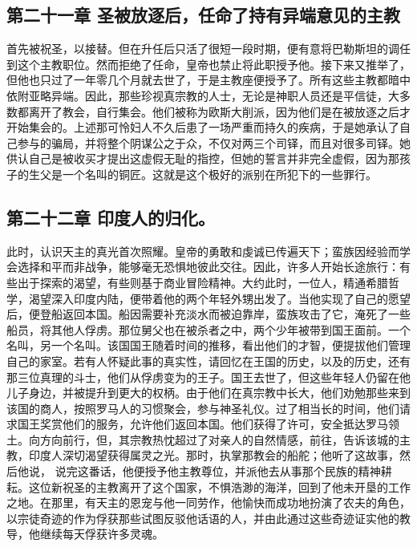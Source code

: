
\subsection{第二十一章 圣被放逐后，任命了持有异端意见的主教}

首先被祝圣，以接替。但在升任后只活了很短一段时期，便有意将巴勒斯坦的调任到这个主教职位。然而拒绝了任命，皇帝也禁止将此职授予他。接下来又推举了，但他也只过了一年零几个月就去世了，于是主教座便授予了。所有这些主教都暗中依附亚略异端。因此，那些珍视真宗教的人士，无论是神职人员还是平信徒，大多数都离开了教会，自行集会。他们被称为欧斯大削派，因为他们是在被放逐之后才开始集会的。上述那可怜妇人不久后患了一场严重而持久的疾病，于是她承认了自己参与的骗局，并将整个阴谋公之于众，不仅对两三个司铎，而且对很多司铎。她供认自己是被收买才提出这虚假无耻的指控，但她的誓言并非完全虚假，因为那孩子的生父是一个名叫的铜匠。这就是这个极好的派别在所犯下的一些罪行。\par


\subsection{第二十二章 印度人的归化。}

此时，认识天主的真光首次照耀。皇帝的勇敢和虔诚已传遍天下；蛮族因经验而学会选择和平而非战争，能够毫无恐惧地彼此交往。因此，许多人开始长途旅行：有些出于探索的渴望，有些则基于商业冒险精神。大约此时，一位人，精通希腊哲学，渴望深入印度内陆，便带着他的两个年轻外甥出发了。当他实现了自己的愿望后，便登船返回本国。船因需要补充淡水而被迫靠岸，蛮族攻击了它，淹死了一些船员，将其他人俘虏。那位舅父也在被杀者之中，两个少年被带到国王面前。一个名叫，另一个名叫。该国国王随着时间的推移，看出他们的才智，便提拔他们管理自己的家室。若有人怀疑此事的真实性，请回忆在王国的历史，以及的历史，还有那三位真理的斗士，他们从俘虏变为的王子。国王去世了，但这些年轻人仍留在他儿子身边，并被提升到更大的权柄。由于他们在真宗教中长大，他们劝勉那些来到该国的商人，按照罗马人的习惯聚会，参与神圣礼仪。过了相当长的时间，他们请求国王奖赏他们的服务，允许他们返回本国。他们获得了许可，安全抵达罗马领土。向方向前行，但，其宗教热忱超过了对亲人的自然情感，前往，告诉该城的主教，印度人深切渴望获得属灵之光。那时，执掌那教会的船舵；他听了这故事，然后他说， 说完这番话，他便授予他主教尊位，并派他去从事那个民族的精神耕耘。这位新祝圣的主教离开了这个国家，不惧浩渺的海洋，回到了他未开垦的工作之地。在那里，有天主的恩宠与他一同劳作，他愉快而成功地扮演了农夫的角色，以宗徒奇迹的作为俘获那些试图反驳他话语的人，并由此通过这些奇迹证实他的教导，他继续每天俘获许多灵魂。\par

